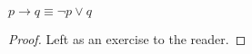 \guard




\begin{prop}
\label{prop:conditionEquivalence}
  $p\rightarrow q \equiv \neg p\vee q$
\end{prop}
\begin{proof}
  Left as an exercise to the reader.
\end{proof}
